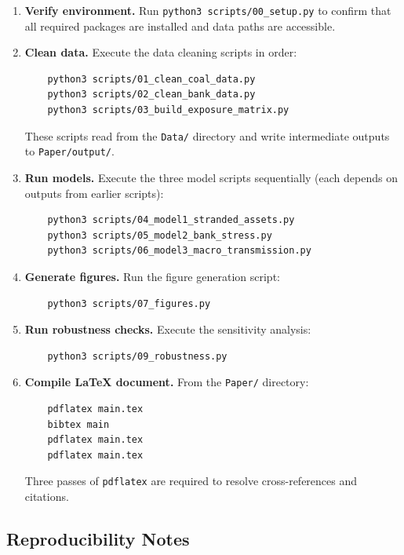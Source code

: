 \begin{enumerate}
    \item \textbf{Verify environment.} Run \texttt{python3 scripts/00\_setup.py} to confirm that all required packages are installed and data paths are accessible.

    \item \textbf{Clean data.} Execute the data cleaning scripts in order:
    \begin{verbatim}
    python3 scripts/01_clean_coal_data.py
    python3 scripts/02_clean_bank_data.py
    python3 scripts/03_build_exposure_matrix.py
    \end{verbatim}
    These scripts read from the \texttt{Data/} directory and write intermediate outputs to \texttt{Paper/output/}.

    \item \textbf{Run models.} Execute the three model scripts sequentially (each depends on outputs from earlier scripts):
    \begin{verbatim}
    python3 scripts/04_model1_stranded_assets.py
    python3 scripts/05_model2_bank_stress.py
    python3 scripts/06_model3_macro_transmission.py
    \end{verbatim}

    \item \textbf{Generate figures.} Run the figure generation script:
    \begin{verbatim}
    python3 scripts/07_figures.py
    \end{verbatim}

    \item \textbf{Run robustness checks.} Execute the sensitivity analysis:
    \begin{verbatim}
    python3 scripts/09_robustness.py
    \end{verbatim}

    \item \textbf{Compile \LaTeX{} document.} From the \texttt{Paper/} directory:
    \begin{verbatim}
    pdflatex main.tex
    bibtex main
    pdflatex main.tex
    pdflatex main.tex
    \end{verbatim}
    Three passes of \texttt{pdflatex} are required to resolve cross-references and citations.
\end{enumerate}


\subsection{Reproducibility Notes}
\label{subsec:reproducibility}

